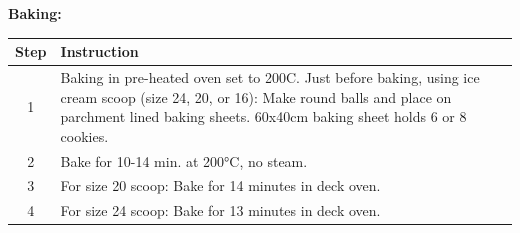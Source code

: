 \noindent\textbf{Baking:}
\begin{center}
\begin{tabular}{|c|p{12cm}|}
    \hline
    \textbf{Step} & \textbf{Instruction} \\
    \hline
    1 & Baking in pre-heated oven set to 200C. Just before baking, using ice cream scoop (size 24, 20, or 16): Make round balls and place on parchment lined baking sheets. 60x40cm baking sheet holds 6 or 8 cookies. \\
    \hline
    2 & Bake for 10-14 min. at 200°C, no steam. \\
    \hline
    3 & For size 20 scoop: Bake for 14 minutes in deck oven. \\
    \hline
    4 & For size 24 scoop: Bake for 13 minutes in deck oven. \\
    \hline
\end{tabular}
\end{center}